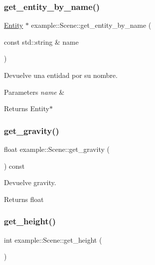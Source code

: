 \subsubsection{\texorpdfstring{get\_entity\_by\_name()}{get\_entity\_by\_name()}}
{\footnotesize\ttfamily \mbox{\hyperlink{classexample_1_1_entity}{Entity}} $\ast$ example\+::\+Scene\+::get\+\_\+entity\+\_\+by\+\_\+name (\begin{DoxyParamCaption}\item[{const std\+::string \&}]{name }\end{DoxyParamCaption})}



Devuelve una entidad por su nombre. 


\begin{DoxyParams}{Parameters}
{\em name} & \\
\hline
\end{DoxyParams}
\begin{DoxyReturn}{Returns}
Entity$\ast$ 
\end{DoxyReturn}
\mbox{\label{classexample_1_1_scene_a39dd7f357b227855409fd54fc73025ce}} 
\subsubsection{\texorpdfstring{get\_gravity()}{get\_gravity()}}
{\footnotesize\ttfamily float example\+::\+Scene\+::get\+\_\+gravity (\begin{DoxyParamCaption}{ }\end{DoxyParamCaption}) const\hspace{0.3cm}{\ttfamily [inline]}}



Devuelve gravity. 

\begin{DoxyReturn}{Returns}
float 
\end{DoxyReturn}
\mbox{\label{classexample_1_1_scene_a3ff2b375c40031835ed6f94910f74094}} 
\subsubsection{\texorpdfstring{get\_height()}{get\_height()}}
{\footnotesize\ttfamily int example\+::\+Scene\+::get\+\_\+height (\begin{DoxyParamCaption}{ }\end{DoxyParamCaption})\hspace{0.3cm}{\ttfamily [inline]}}




